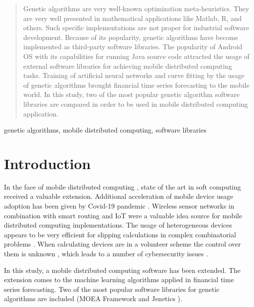 \documentclass[conference]{IEEEtran}
\begin{document}
\begin{abstract}
Genetic algorithms are very well-known optimization meta-heuristics. They are very well presented in mathematical applications like Matlab, R, and others. Such specific implementations are not proper for industrial software development. Because of its popularity, genetic algorithms have become implemented as third-party software libraries. The popularity of Android OS with its capabilities for running Java source code attracted the usage of external software libraries for achieving mobile distributed computing tasks. Training of artificial neural networks and curve fitting by the usage of genetic algorithms brought financial time series forecasting to the mobile world. In this study, two of the most popular genetic algorithm software libraries are compared in order to be used in mobile distributed computing application.
\end{abstract}

\begin{IEEEkeywords}
genetic algorithms, mobile distributed computing, software libraries
\end{IEEEkeywords}

\section{Introduction}

In the face of mobile distributed computing \cite{Bibi-2021-a}, state of the art in soft computing \cite{Angelova-2009-a} received a valuable extension. Additional acceleration of mobile device usage adoption has been given by Covid-19 pandemic \cite{Petrov-2021-a}. Wireless sensor networks \cite{Alexandrov-2016-a} in combination with smart routing \cite{Tashev-2019-a} and IoT \cite{Dineva-2019-a} were a valuable idea source for mobile distributed computing implementations. The usage of heterogeneous devices \cite{Weinbub-2012-a}  appears to be very efficient for slipping calculations in complex combinatorial problems \cite{Borissova-2015-a}. When calculating devices are in a volunteer scheme the control over them is unknown \cite{Balabanov-2020-a}, which leads to a number of cybersecurity issues \cite{Dimitrov-2021-a}. 

In this study, a mobile distributed computing software \cite{Balabanov-2022-a} has been extended. The extension comes to the machine learning algorithms applied in financial time series forecasting. Two of the most popular software libraries for genetic algorithms are included (MOEA Framework \cite{Huo-2018-a} and Jenetics \cite{Aalam-2022-a}). 
\end{document}
